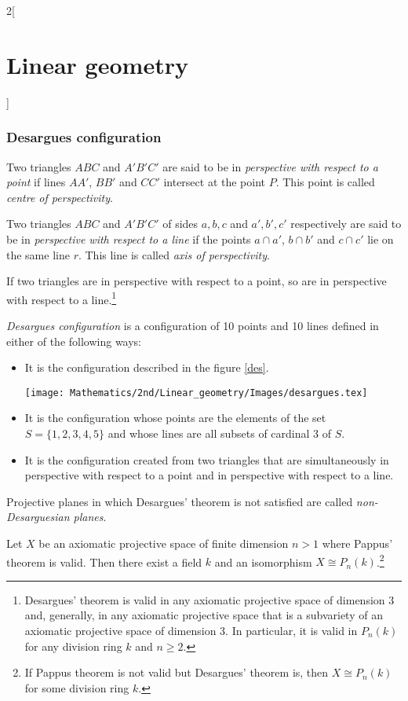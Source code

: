 \documentclass[class=article,10pt,crop=false]{standalone}
\begin{document}
\begin{multicols}{2}[\section{Linear geometry}]
\subsubsection*{Desargues configuration}
\begin{definition}
Two triangles $ABC$ and $A'B'C'$ are said to be in \textit{perspective with respect to a point} if lines $AA'$, $BB'$ and $CC'$ intersect at the point $P$. This point is called \textit{centre of perspectivity}.
\end{definition}
\begin{definition}
Two triangles $ABC$ and $A'B'C'$ of sides $a,b,c$ and $a',b',c'$ respectively are said to be in \textit{perspective with respect to a line} if the points $a\cap a'$, $b\cap b'$ and $c\cap c'$ lie on the same line $r$. This line is called \textit{axis of perspectivity}.
\end{definition}
\begin{theorem}
If two triangles are in perspective with respect to a point, so are in perspective with respect to a line.\footnote{Desargues' theorem is valid in any axiomatic projective space of dimension 3 and, generally, in any axiomatic projective space that is a subvariety of an axiomatic projective space of dimension 3. In particular, it is valid in $P_n(k)$ for any division ring $k$ and $n\geq2$.}
\end{theorem}
\begin{definition}
\textit{Desargues configuration} is a configuration of 10 points and 10 lines defined in either of the following ways:
\begin{itemize}
    \item It is the configuration described in the figure \ref{des}.\par
    \begin{minipage}{\linewidth} 
        \centering
        \texttt{[image: Mathematics/2nd/Linear\_geometry/Images/desargues.tex]} 
        \label{des}
    \end{minipage}
    \item It is the configuration whose points are the elements of the set $S=\{1,2,3,4,5\}$ and whose lines are all subsets of cardinal 3 of $S$.
    \item It is the configuration created from two triangles that are simultaneously in perspective with respect to a point and in perspective with respect to a line. 
\end{itemize}
\end{definition}
\begin{definition}
Projective planes in which Desargues' theorem is not satisfied are called \textit{non-Desarguesian planes}.
\end{definition}
\begin{theorem}
Let $X$ be an axiomatic projective space of finite dimension $n>1$ where Pappus' theorem is valid. Then there exist a field $k$ and an isomorphism $X\cong P_n(k)$.\footnote{If Pappus theorem is not valid but Desargues' theorem is, then $X\cong P_n(k)$ for some division ring $k$.}
\end{theorem}

\end{multicols}
\end{document}
